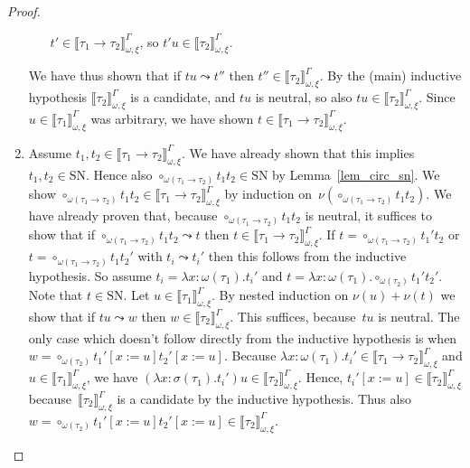 \documentclass[runningheads,a4paper]{llncs}
\newcommand{\subst}[2]{#1:=#2}
\newcommand{\SN}{\mathrm{SN}}
\newcommand{\val}[3]{\ensuremath{\llbracket#1\rrbracket_{#2}^{#3}}}
\begin{document}
\begin{proof}
\begin{enumerate}
\begin{itemize}
      $t' \in \val{\tau_1\to\tau_2}{\omega,\xi}{\Gamma}$, so
      $t' u \in \val{\tau_2}{\omega,\xi}{\Gamma}$.
    \end{itemize}
    We have thus shown that if $t u \leadsto t''$ then
    $t'' \in \val{\tau_2}{\omega,\xi}{\Gamma}$. By the (main)
    inductive hypothesis $\val{\tau_2}{\omega,\xi}{\Gamma}$ is a
    candidate, and $t u$ is neutral, so also
    $t u \in \val{\tau_2}{\omega,\xi}{\Gamma}$. Since
    $u \in \val{\tau_1}{\omega,\xi}{\Gamma}$ was arbitrary, we have
    shown $t \in \val{\tau_1\to\tau_2}{\omega,\xi}{\Gamma}$.
  \item Assume
    $t_1,t_2 \in \val{\tau_1\to\tau_2}{\omega,\xi}{\Gamma}$. We have
    already shown that this implies $t_1,t_2 \in \SN$. Hence also
    $\circ_{\omega(\tau_1\to\tau_2)} t_1 t_2 \in \SN$ by
    Lemma~\ref{lem_circ_sn}. We show
    $\circ_{\omega(\tau_1\to\tau_2)} t_1 t_2 \in
    \val{\tau_1\to\tau_2}{\omega,\xi}{\Gamma}$ by induction
    on~$\nu(\circ_{\omega(\tau_1\to\tau_2)} t_1 t_2)$. We have already
    proven that, because $\circ_{\omega(\tau_1\to\tau_2)} t_1 t_2$ is
    neutral, it suffices to show that if
    $\circ_{\omega(\tau_1\to\tau_2)} t_1 t_2 \leadsto t$ then
    $t \in \val{\tau_1\to\tau_2}{\omega,\xi}{\Gamma}$. If
    $t = \circ_{\omega(\tau_1\to\tau_2)} t_1' t_2$ or
    $t = \circ_{\omega(\tau_1\to\tau_2)} t_1 t_2'$ with
    $t_i \leadsto t_i'$ then this follows from the inductive
    hypothesis. So assume $t_i = \lambda x : \omega(\tau_1) . t_i'$
    and
    $t = \lambda x : \omega(\tau_1) . \circ_{\omega(\tau_2)} t_1'
    t_2'$. Note that $t \in \SN$. Let
    $u \in \val{\tau_1}{\omega,\xi}{\Gamma}$. By nested induction on
    $\nu(u) + \nu(t)$ we show that if $t u \leadsto w$ then
    $w \in \val{\tau_2}{\omega,\xi}{\Gamma}$. This suffices,
    because~$t u$ is neutral. The only case which doesn't follow
    directly from the inductive hypothesis is when
    $w = \circ_{\omega(\tau_2)} t_1'[\subst{x}{u}]
    t_2'[\subst{x}{u}]$. Because
    $\lambda x : \omega(\tau_1) . t_i' \in
    \val{\tau_1\to\tau_2}{\omega,\xi}{\Gamma}$ and
    $u \in \val{\tau_1}{\omega,\xi}{\Gamma}$, we have
    $(\lambda x : \sigma(\tau_1) . t_i') u \in
    \val{\tau_2}{\omega,\xi}{\Gamma}$. Hence,
    $t_i'[\subst{x}{u}] \in \val{\tau_2}{\omega,\xi}{\Gamma}$
    because~$\val{\tau_2}{\omega,\xi}{\Gamma}$ is a candidate by the
    inductive hypothesis. Thus also
    $w = \circ_{\omega(\tau_2)} t_1'[\subst{x}{u}] t_2'[\subst{x}{u}]
    \in \val{\tau_2}{\omega,\xi}{\Gamma}$.
  \end{enumerate}


\end{proof}
\end{document}
